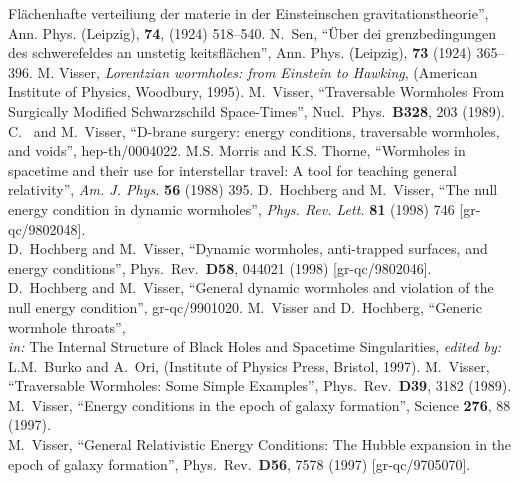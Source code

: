 \documentclass[a4paper,12pt]{article}
\begin{document}
\begin{thebibliography}{99}
Fl\"achenhafte verteiliung der materie in der Einsteinschen gravitationstheorie'', 
Ann. Phys. (Leipzig), {\bf 74}, (1924) 518--540.
N.~Sen, 
``\"Uber dei grenzbedingungen des schwerefeldes an unstetig keitsfl\"achen'',
Ann. Phys. (Leipzig), {\bf 73} (1924) 365--396.
M. Visser, 
{\em Lorentzian wormholes: from Einstein to Hawking},
(American Institute of Physics, Woodbury, 1995). 
M.~Visser,
``Traversable Wormholes From Surgically Modified Schwarzschild Space-Times'',
Nucl.\ Phys.\  {\bf B328}, 203 (1989).
C.~{\Barcelo} and M.~Visser,
``D-brane surgery: energy conditions, traversable wormholes, and voids'',
hep-th/0004022.
M.S. Morris and K.S. Thorne, 
``Wormholes in spacetime and their use for interstellar travel:
A tool for teaching general relativity'',
{\em Am. J. Phys.} {\bf 56} (1988) 395.   
D.~Hochberg and M.~Visser, 
``The null energy condition in dynamic wormholes'',
{\em Phys. Rev. Lett.} {\bf 81} (1998) 746 [gr-qc/9802048].
\\
D.~Hochberg and M.~Visser,
``Dynamic wormholes, anti-trapped surfaces, and energy conditions'',
Phys.\ Rev.\  {\bf D58}, 044021 (1998)
[gr-qc/9802046].
\\
D.~Hochberg and M.~Visser,
``General dynamic wormholes and violation of the null energy condition'',
gr-qc/9901020.
M.~Visser and D.~Hochberg,
``Generic wormhole throats'',
\\
{\sl in:} The Internal Structure of Black Holes and Spacetime Singularities,
{\sl edited by:} L.M.~Burko and A.~Ori,
(Institute of Physics Press, Bristol, 1997).
M.~Visser,
``Traversable Wormholes: Some Simple Examples'',
Phys.\ Rev.\  {\bf D39}, 3182 (1989).
M.~Visser,
``Energy conditions in the epoch of galaxy formation'',
Science {\bf 276}, 88 (1997).
\\
M.~Visser,
``General Relativistic Energy Conditions: 
The Hubble expansion in the epoch of galaxy formation'',
Phys.\ Rev.\  {\bf D56}, 7578 (1997)
[gr-qc/9705070].
\end{thebibliography} 
\end{document}
